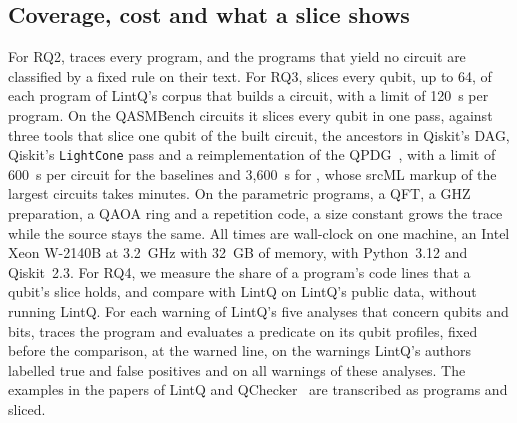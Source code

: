\subsection{Coverage, cost and what a slice shows}
For RQ2, \tool{} traces every program, and the programs that yield no circuit are classified by a fixed rule on their
text. For RQ3, \tool{} slices every qubit, up to 64, of each program of LintQ's corpus that builds a circuit, with a limit
of 120~s per program. On the QASMBench circuits it slices every qubit in one pass, against three tools that slice one
qubit of the built circuit, the ancestors in Qiskit's DAG, Qiskit's \texttt{LightCone} pass and a reimplementation of the
QPDG~\cite{yu2025qpdg}, with a limit of 600~s per circuit for the baselines and 3{,}600~s for \tool{}, whose
srcML markup of the largest circuits takes minutes. On the parametric programs, a QFT, a GHZ preparation, a QAOA
ring and a repetition code, a size constant grows the trace while the source stays the same. All times are wall-clock on
one machine, an Intel Xeon W-2140B at 3.2~GHz with 32~GB of memory, with Python~3.12 and Qiskit~2.3. For RQ4, we measure
the share of a program's code lines that a qubit's slice holds, and compare \tool{} with LintQ on LintQ's public data,
without running LintQ. For each warning of LintQ's five analyses that concern qubits and bits, \tool{} traces the
program and evaluates a predicate on its qubit profiles, fixed before the comparison, at the warned line, on the warnings
LintQ's authors labelled true and false positives and on all warnings of these analyses. The examples in the papers of LintQ
and QChecker~\cite{paltenghi2024lintq, zhao2023qchecker} are transcribed as programs and sliced.
